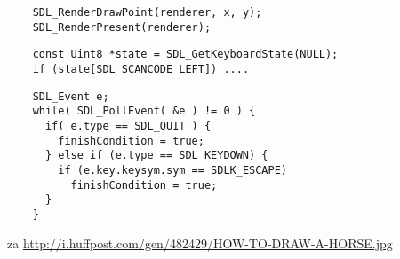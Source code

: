 \documentclass{beamer}
\begin{document}
\begin{frame}[fragile]
    \begin{verbatim}
    SDL_RenderDrawPoint(renderer, x, y);
    SDL_RenderPresent(renderer);
     \end{verbatim}
     \EB
\end{frame}
\begin{frame}[fragile]
    \begin{verbatim}
    const Uint8 *state = SDL_GetKeyboardState(NULL);
    if (state[SDL_SCANCODE_LEFT]) ....
     \end{verbatim}
     \EB
\end{frame}
\begin{frame}[fragile]
    \begin{verbatim}
    SDL_Event e;
    while( SDL_PollEvent( &e ) != 0 ) { 
      if( e.type == SDL_QUIT ) { 
        finishCondition = true;
      } else if (e.type == SDL_KEYDOWN) {
        if (e.key.keysym.sym == SDLK_ESCAPE)
          finishCondition = true;
      }
    }
     \end{verbatim}
     \EB
\end{frame}
\begin{frame}[fragile]
     \EB
     {\small{za \url{http://i.huffpost.com/gen/482429/HOW-TO-DRAW-A-HORSE.jpg}}}
\end{frame}
\end{document}
